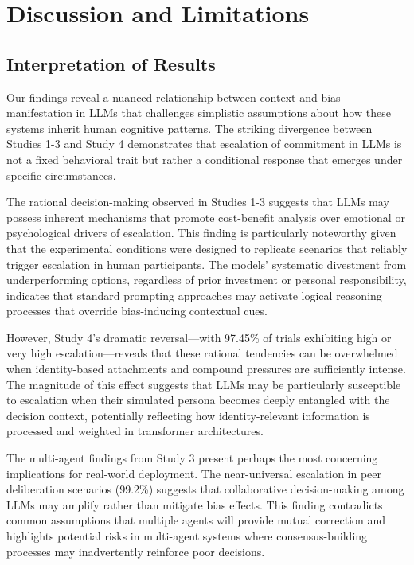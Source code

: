 \documentclass[letterpaper]{article} %
\begin{document}
\section{Discussion and Limitations}

\subsection{Interpretation of Results}

Our findings reveal a nuanced relationship between context and bias manifestation in LLMs that challenges simplistic assumptions about how these systems inherit human cognitive patterns. The striking divergence between Studies 1-3 and Study 4 demonstrates that escalation of commitment in LLMs is not a fixed behavioral trait but rather a conditional response that emerges under specific circumstances.

The rational decision-making observed in Studies 1-3 suggests that LLMs may possess inherent mechanisms that promote cost-benefit analysis over emotional or psychological drivers of escalation. This finding is particularly noteworthy given that the experimental conditions were designed to replicate scenarios that reliably trigger escalation in human participants. The models' systematic divestment from underperforming options, regardless of prior investment or personal responsibility, indicates that standard prompting approaches may activate logical reasoning processes that override bias-inducing contextual cues.

However, Study 4's dramatic reversal---with 97.45\% of trials exhibiting high or very high escalation---reveals that these rational tendencies can be overwhelmed when identity-based attachments and compound pressures are sufficiently intense. The magnitude of this effect suggests that LLMs may be particularly susceptible to escalation when their simulated persona becomes deeply entangled with the decision context, potentially reflecting how identity-relevant information is processed and weighted in transformer architectures.

The multi-agent findings from Study 3 present perhaps the most concerning implications for real-world deployment. The near-universal escalation in peer deliberation scenarios (99.2\%) suggests that collaborative decision-making among LLMs may amplify rather than mitigate bias effects. This finding contradicts common assumptions that multiple agents will provide mutual correction and highlights potential risks in multi-agent systems where consensus-building processes may inadvertently reinforce poor decisions.
\end{document}
